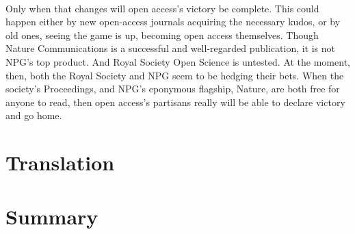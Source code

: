 \documentclass[a4paper, 12pt, UTF8]{article}
\begin{document}
\paragraph*{}
    Only when that changes will open access’s victory be complete. This could happen either by new open-access journals acquiring the necessary kudos, or by old ones, seeing the game is up, becoming open access themselves. Though Nature Communications is a successful and well-regarded publication, it is not NPG’s top product. And Royal Society Open Science is untested. At the moment, then, both the Royal Society and NPG seem to be hedging their bets. When the society’s Proceedings, and NPG’s eponymous flagship, Nature, are both free for anyone to read, then open access’s partisans really will be able to declare victory and go home.

\section{Translation}
\section{Summary}
\end{document}
